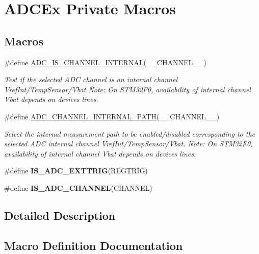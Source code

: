 \hypertarget{group___a_d_c_ex___private___macros}{}\section{A\+D\+C\+Ex Private Macros}
\label{group___a_d_c_ex___private___macros}
\subsection*{Macros}
\begin{DoxyCompactItemize}
\item 
\#define \hyperlink{group___a_d_c_ex___private___macros_gafc2b5a27b9e60b2822591a19cbca11ff}{A\+D\+C\+\_\+\+I\+S\+\_\+\+C\+H\+A\+N\+N\+E\+L\+\_\+\+I\+N\+T\+E\+R\+N\+AL}(\+\_\+\+\_\+\+C\+H\+A\+N\+N\+E\+L\+\_\+\+\_\+)
\begin{DoxyCompactList}\small\item\em Test if the selected A\+DC channel is an internal channel Vref\+Int/\+Temp\+Sensor/\+Vbat Note\+: On S\+T\+M32\+F0, availability of internal channel Vbat depends on devices lines. \end{DoxyCompactList}\item 
\#define \hyperlink{group___a_d_c_ex___private___macros_ga27b743f3afcb778ad1885debb677080b}{A\+D\+C\+\_\+\+C\+H\+A\+N\+N\+E\+L\+\_\+\+I\+N\+T\+E\+R\+N\+A\+L\+\_\+\+P\+A\+TH}(\+\_\+\+\_\+\+C\+H\+A\+N\+N\+E\+L\+\_\+\+\_\+)
\begin{DoxyCompactList}\small\item\em Select the internal measurement path to be enabled/disabled corresponding to the selected A\+DC internal channel Vref\+Int/\+Temp\+Sensor/\+Vbat. Note\+: On S\+T\+M32\+F0, availability of internal channel Vbat depends on devices lines. \end{DoxyCompactList}\item 
\#define {\bfseries I\+S\+\_\+\+A\+D\+C\+\_\+\+E\+X\+T\+T\+R\+IG}(R\+E\+G\+T\+R\+IG)
\item 
\#define {\bfseries I\+S\+\_\+\+A\+D\+C\+\_\+\+C\+H\+A\+N\+N\+EL}(C\+H\+A\+N\+N\+EL)
\end{DoxyCompactItemize}


\subsection{Detailed Description}


\subsection{Macro Definition Documentation}
\mbox{\label{group___a_d_c_ex___private___macros_ga27b743f3afcb778ad1885debb677080b}} 
